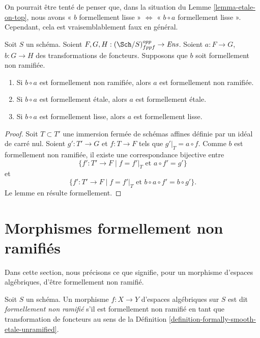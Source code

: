 \begin{remark}
\label{remark-tempting}
On pourrait être tenté de penser que, dans la situation du
Lemme \ref{lemma-etale-on-top},
nous avons
« $b$ formellement lisse » $\Leftrightarrow$ « $b \circ a$ formellement lisse ».
Cependant, cela est vraisemblablement faux en général.
\end{remark}

\begin{lemma}
\label{lemma-formally-permanence}
Soit $S$ un schéma.
Soient $F, G, H : (\Sch/S)_{fppf}^{opp} \to \textit{Ens}$.
Soient $a : F \to G$, $b : G \to H$ des transformations de foncteurs.
Supposons que $b$ soit formellement non ramifiée.
\begin{enumerate}
\item Si $b \circ a$ est formellement non ramifiée, alors $a$ est formellement non ramifiée.
\item Si $b \circ a$ est formellement étale, alors $a$ est formellement étale.
\item Si $b \circ a$ est formellement lisse, alors $a$ est formellement lisse.
\end{enumerate}
\end{lemma}

\begin{proof}
Soit $T \subset T'$ une immersion fermée de schémas affines définie par un idéal
de carré nul. Soient $g' : T' \to G$ et $f : T \to F$ tels que
$g'|_T = a \circ f$. Comme $b$ est formellement non ramifiée, il existe une correspondance
bijective entre
$$
\{f' : T' \to F \mid f = f'|_T\text{ et }a \circ f' = g'\}
$$
et
$$
\{f' : T' \to F \mid f = f'|_T\text{ et }b \circ a \circ f' = b \circ g'\}.
$$
Le lemme en résulte formellement.
\end{proof}








\section{Morphismes formellement non ramifiés}
\label{section-formally-unramified}

\noindent
Dans cette section, nous précisons ce que signifie, pour un morphisme d'espaces algébriques,
d'être formellement non ramifié.

\begin{definition}
\label{definition-formally-unramified}
Soit $S$ un schéma. Un morphisme $f : X \to Y$ d'espaces algébriques sur $S$
est dit {\it formellement non ramifié} s'il est formellement non ramifié en tant que
transformation de foncteurs au sens de la
Définition \ref{definition-formally-smooth-etale-unramified}.
\end{definition}

